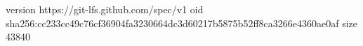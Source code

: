 version https://git-lfs.github.com/spec/v1
oid sha256:cc233cc49c76cf36904fa3230664dc3d60217b5875b52ff8ca3266e4360ae0af
size 43840
